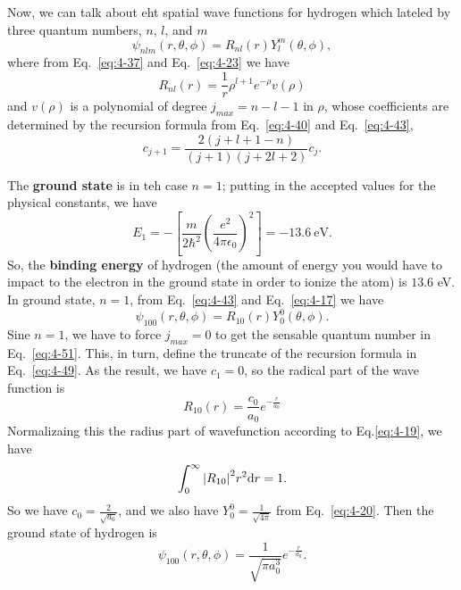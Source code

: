 Now, we can talk about eht spatial wave functions for hydrogen which lateled by three quantum numbers, $n$, $l$, and $m$
\begin{equation}
  \label{eq:4-47}
  \psi_{nlm} \left( r, \theta, \phi \right) = R_{nl} \left( r \right) Y_l^m \left( \theta,\phi \right),
\end{equation}
where from Eq.~\eqref{eq:4-37} and Eq.~\eqref{eq:4-23} we have
\begin{equation}
  \label{eq:4-48}
  R_{nl} \left( r \right) = \frac{1}{r} \rho^{l+1} e^{-\rho} v \left( \rho \right)
\end{equation}
and $v \left( \rho \right)$ is a polynomial of degree $j_{max}= n-l-1$ in $\rho$, whose coefficients are determined by the recursion formula from Eq.~\eqref{eq:4-40} and Eq.~\eqref{eq:4-43},
\begin{equation}
  \label{eq:4-49}
  c_{j+1} = \frac{2 \left( j+l+1-n \right)}{ \left( j+1 \right) \left( j+2l+2 \right)} c_{j} .
\end{equation}

The \textbf{ground state} is in teh case $n=1$; putting in the accepted values for the physical constants, we have
\begin{equation}
  \label{eq:4-50}
  E_1 = - \left[ \frac{m}{2\hbar^{2}} \left( \frac{e^{2}}{4 \pi \epsilon_{0}} \right)^2 \right] = -13.6 ~ \text{eV}.
\end{equation}
So, the \textbf{binding energy} of hydrogen (the amount of energy you would have to impact to the electron in the ground state in order to ionize the atom) is $13.6$ eV.
In ground state, $n=1$, from Eq.~\eqref{eq:4-43} and Eq.~\eqref{eq:4-17} we have
\begin{equation}
  \label{eq:4-51}
  \psi_{100} \left( r,\theta,\phi \right) = R_{10} (r) Y_0^0 \left( \theta,\phi \right).
\end{equation}
Sine $n=1$, we have to force $j_{max}=0$ to get the sensable quantum number in Eq.~\eqref{eq:4-51}.
This, in turn, define the truncate of the recursion formula in Eq.~\eqref{eq:4-49}.
As the result, we have $c_1=0$, so the radical part of the wave function is
\begin{equation}
  \label{eq:4-52}
  R_{10} \left( r \right) = \frac{c_{0}}{a_{0}} e^{- \frac{r}{a_{0}}}
\end{equation}
Normalizaing this the radius part of wavefunction according to Eq.\eqref{eq:4-19}, we have
\begin{equation*}
  \int_0^{\infty} \abs{R_{10}}^{2} r^2 \dd r = 1.
\end{equation*}
So we have $c_0= \frac{2}{\sqrt{a_{0}}}$, and we also have $Y_0^0= \frac{1}{\sqrt{4\pi}}$ from Eq.~\eqref{eq:4-20}.
Then the ground state of hydrogen is
\begin{equation}
  \label{eq:4-53}
  \psi_{100} \left( r,\theta,\phi \right) = \frac{1}{\sqrt{\pi a_{0}^{3}}} e^{- \frac{r}{a_{0}}}.
\end{equation}

